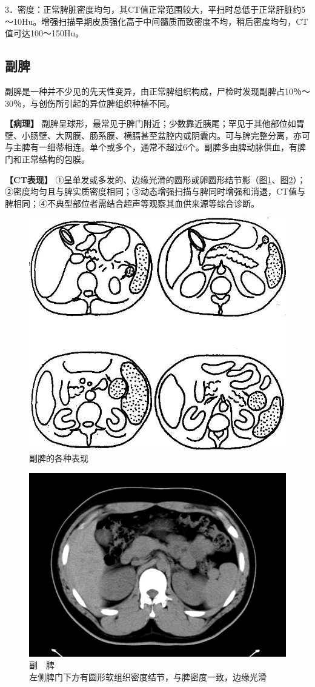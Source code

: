 3．密度：正常脾脏密度均匀，其CT值正常范围较大，平扫时总低于正常肝脏约5～10Hu。增强扫描早期皮质强化高于中间髓质而致密度不均，稍后密度均匀，CT值可达100～150Hu。

\subsection{副脾}

副脾是一种并不少见的先天性变异，由正常脾组织构成，尸检时发现副脾占10％～30％，与创伤所引起的异位脾组织种植不同。

\textbf{【病理】}
副脾呈球形，最常见于脾门附近；少数靠近胰尾；罕见于其他部位如胃壁、小肠壁、大网膜、肠系膜、横膈甚至盆腔内或阴囊内。可与脾完整分离，亦可与主脾有一细蒂相连。单个或多个，通常不超过6个。副脾多由脾动脉供血，有脾门和正常结构的包膜。

\textbf{【CT表现】}
①呈单发或多发的、边缘光滑的圆形或卵圆形结节影（图\ref{fig14-1}、图\ref{fig14-2}）；②密度均匀且与脾实质密度相同；③动态增强扫描与脾同时增强和消退，CT值与脾相同；④不典型部位者需结合超声等观察其血供来源等综合诊断。

\begin{figure}[!htbp]
 \centering
 \includegraphics[width=.7\textwidth,height=\textheight,keepaspectratio]{./images/Image00309.jpg}
 \captionsetup{justification=centering}
 \caption{副脾的各种表现}
 \label{fig14-1}
  \end{figure} 

\begin{figure}[!htbp]
 \centering
 \includegraphics[width=.7\textwidth,height=\textheight,keepaspectratio]{./images/Image00310.jpg}
 \captionsetup{justification=centering}
 \caption{副　脾\\{\small 左侧脾门下方有圆形软组织密度结节，与脾密度一致，边缘光滑}}
 \label{fig14-2}
  \end{figure} 

